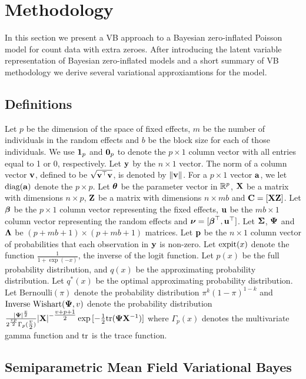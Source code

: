 \documentclass{article}[12pt]
\begin{document}
\section{Methodology}
\label{sec:methodology}

In this section we present a VB approach to a Bayesian zero-inflated Poisson model for count data with extra
zeroes. After introducing the latent variable representation of Bayesian zero-inflated models and a short summary 
of VB methodology we derive several variational approxiamtions for the model.

\subsection{Definitions}

Let $p$ be the dimension of the space of fixed effects, $m$ be the number of individuals in the random effects
and $b$ be the block size for each of those individuals.
We use ${\bf 1}_p$ and ${\bf 0}_p$ to denote the $p \times 1$ column vector with all entries equal to 1 or 0,
respectively.
Let ${\bf y}$ by the $n \times 1$ vector.
The norm of a column vector ${\bf v}$, defined to be $\sqrt{{\bf v}^\top {\bf v}}$, is denoted by $\|{\bf v}\|$.
For a $p \times 1$ vector ${\bf a}$, we let $\text{diag}{({\bf a})}$ denote the $p \times p$.
Let ${\boldsymbol \theta}$ be the parameter vector in ${\mathbb{R}}^p$,
${\bf X}$ be a matrix with dimensions $n \times p$,
${\bf Z}$ be a matrix with dimensions $n \times m b$
and ${\bf C} = [ {\bf X} {\bf Z} ]$.
Let ${\boldsymbol \beta}$ be the $p \times 1$ column vector representing the fixed effects,
${\bf u}$ be the $m b \times 1$ column vector representing the random effects
and ${\boldsymbol \nu} = [{\boldsymbol \beta}^\top, {\bf u}^\top]$.
Let ${\boldsymbol \Sigma}$, ${\boldsymbol \Psi}$ and ${\boldsymbol \Lambda}$ be $(p + m b + 1) \times (p + m b + 1)$ matrices.
Let ${\bf p}$ be the $n \times 1$ column vector of probabilities that each observation in ${\bf y}$ is non-zero.
Let $\text{expit} (x)$ denote the function $\tfrac{1}{1 + \exp(-x)}$, the inverse of the logit function.
Let $p(x)$ be the full probability distribution, and $q(x)$ be the approximating probability distribution.
Let $q^*(x)$ be the optimal approximating probability distribution.
Let $\text{Bernoulli}(\pi)$  denote the probability distribution $\pi^k (1 - \pi)^{1-k}$
and $\text{Inverse Wishart}({\boldsymbol \Psi}, v)$ denote the probability distribution
$\tfrac{|{\boldsymbol \Psi}|^\frac{v}{2}}{2^{\frac{vp}{2}} \Gamma_p{(\tfrac{v}{2})}} |{\bf X}|^{-\tfrac{v + p + 1}{2}} \exp{[- \tfrac{1}{2} \text{tr}{({\boldsymbol\Psi}{\bf X}^{-1})}]}$ where $\Gamma_p{(x)}$ denotes the multivariate gamma function and
$\text{tr}$ is the trace function.


\subsection{Semiparametric Mean Field Variational Bayes}
\end{document}
